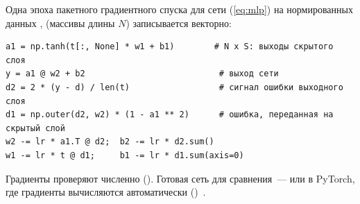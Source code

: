 Одна эпоха пакетного градиентного спуска для сети (\ref{eq:mlp}) на нормированных данных ,
 (массивы длины $N$) записывается векторно:
\begin{lstlisting}
a1 = np.tanh(t[:, None] * w1 + b1)        # N x S: выходы скрытого слоя
y = a1 @ w2 + b2                           # выход сети
d2 = 2 * (y - d) / len(t)                  # сигнал ошибки выходного слоя
d1 = np.outer(d2, w2) * (1 - a1 ** 2)      # ошибка, переданная на скрытый слой
w2 -= lr * a1.T @ d2;  b2 -= lr * d2.sum()
w1 -= lr * t @ d1;     b1 -= lr * d1.sum(axis=0)
\end{lstlisting}
Градиенты проверяют численно (). Готовая сеть для сравнения~---
 или
 в PyTorch, где градиенты
вычисляются автоматически ()~\cite{pedregosa2011}.
